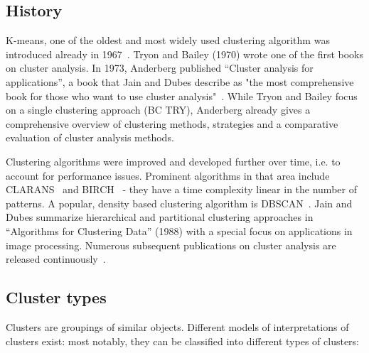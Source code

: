 \subsection{History}

K-means, one of the oldest and most widely used clustering algorithm was introduced already in 1967~\cite{MacQueen67kmeans, Meert06clustermaps}. Tryon and Bailey (1970) wrote one of the first books on cluster analysis. In 1973, Anderberg published ``Cluster analysis for applications'', a book that Jain and Dubes describe as "the most comprehensive book for those who want to use cluster analysis"~\cite{Jain88clustering}.  While Tryon and Bailey focus on a single clustering approach (BC TRY), Anderberg already gives a comprehensive overview of clustering methods, strategies and a comparative evaluation of cluster analysis methods.

Clustering algorithms were improved and developed further over time, i.e. to account for performance issues. Prominent algorithms in that area include CLARANS~\cite{Ng94CLARANS} and BIRCH~\cite{Zhang96BIRCH} - they have a time complexity linear in the number of patterns. A popular, density based clustering algorithm is DBSCAN~\cite{Ester96DBSCAN}. Jain and Dubes summarize hierarchical and partitional clustering approaches in ``Algorithms for Clustering Data'' (1988) with a special focus on applications in image processing. Numerous subsequent publications on cluster analysis are released continuously~\cite{Jain99clusterreview}. 

\subsection{Cluster types}

Clusters are groupings of similar objects. Different models of interpretations of clusters exist: most notably, they can be classified into different types of clusters:

